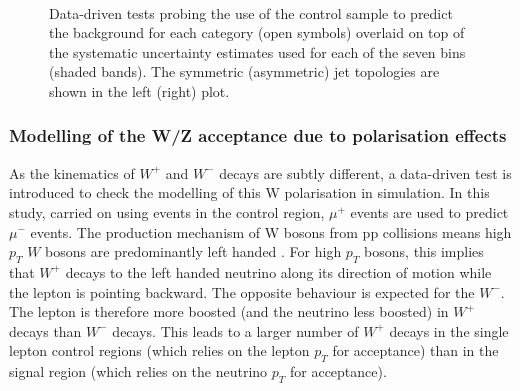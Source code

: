 \begin{figure}[h!]
  \begin{center}
    ~~
    \caption{Data-driven tests probing the use of the \mj control sample
      to predict the \znunu background for each
      \njet category (open symbols) overlaid on top of the systematic
      uncertainty estimates used for each of the seven \scalht bins (shaded bands).  
      The symmetric (asymmetric) jet topologies are shown in the left (right) plot. 
    }
    \label{fig:closureMuToMuMu}
  \end{center} 
\end{figure}

\subsubsection*{Modelling of the W/Z acceptance due to polarisation effects}
\label{sec:tfSyst_Wpol}

As the kinematics of $W^+$ and $W^-$ decays are subtly different, a
data-driven test is introduced to check the modelling of this W
polarisation in simulation. In this study, carried on using events in
the \mj control region, $\mu^{+}$ events are used to predict $\mu^{-}$
events.  The production mechanism of W bosons from pp collisions means
high $p_T$ $W$ bosons are predominantly left handed \cite{WPol}.  For
high $p_T$ bosons, this implies that $W^+$ decays to the left handed
neutrino along its direction of motion while the lepton is pointing
backward.  The opposite behaviour is expected for the $W^-$. The
lepton is therefore more boosted (and the neutrino less boosted) in
$W^+$ decays than $W^-$ decays.  This leads to a larger number of
$W^+$ decays in the single lepton control regions (which relies on the
lepton $p_T$ for acceptance) than in the signal region (which relies
on the neutrino $p_T$ for acceptance).

